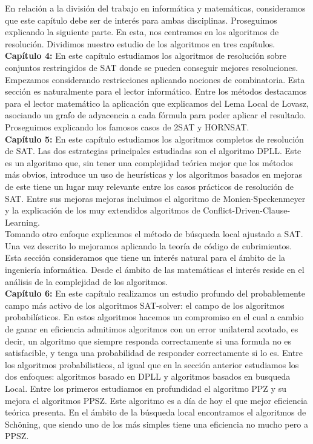 En relación a la división del trabajo en informática y matemáticas, consideramos que este capítulo debe ser de interés para ambas disciplinas. Proseguimos explicando la siguiente parte. En esta, nos centramos en los algoritmos de resolución. Dividimos nuestro estudio de los algoritmos en tres capítulos.\\


\textbf{Capítulo 4:} En este capítulo estudiamos los algoritmos de resolución sobre conjuntos restringidos de SAT donde se pueden conseguir mejores resoluciones. Empezamos considerando restricciones aplicando nociones de combinatoria. Esta sección es naturalmente para el lector informático. Entre los métodos destacamos para el lector matemático la aplicación que explicamos del Lema Local de Lovasz, asociando un grafo de adyacencia a cada fórmula para poder aplicar el resultado. Proseguimos explicando los famosos casos de 2SAT y HORNSAT. \\

\textbf{Capítulo 5:} En este capítulo estudiamos los algoritmos completos de resolución de SAT. Las dos estrategias principales estudiadas son el algoritmo DPLL. Este es un algoritmo que, sin tener una complejidad teórica mejor que los métodos más obvios, introduce un uso de heurísticas y los algoritmos basados en mejoras de este tiene un lugar muy relevante entre los casos prácticos de resolución de SAT. Entre sus mejoras mejoras incluimos el algoritmo de Monien-Speckenmeyer y la explicación de los muy extendidos algoritmos de Conflict-Driven-Clause-Learning.\\

Tomando otro enfoque explicamos el método de búsqueda local ajustado a SAT. Una vez descrito lo mejoramos aplicando la teoría de código de cubrimientos. Esta sección consideramos que tiene un interés natural para el ámbito de la ingeniería informática. Desde el ámbito de las matemáticas el interés reside en el análisis de la complejidad de los algoritmos.\\

\textbf{Capítulo 6:} En este capítulo realizamos un estudio profundo del probablemente campo más activo de los algoritmos SAT-solver: el campo de los algoritmos probabilísticos. En estos algoritmos hacemos un compromiso en el cual a cambio de ganar en eficiencia admitimos algoritmos con un error unilateral acotado, es decir, un algoritmo que siempre responda correctamente si una formula no es satisfacible, y tenga una probabilidad de responder correctamente si lo es. Entre los algoritmos probabilisticos, al igual que en la sección anterior estudiamos los dos enfoques: algoritmos basado en DPLL y algoritmos basados en busqueda Local. Entre los primeros estudiamos en profundidad el algoritmo PPZ y su mejora el algoritmos PPSZ. Este algoritmo es a día de hoy el que mejor eficiencia teórica presenta. En el ámbito de la búsqueda local encontramos el algoritmos de Schöning, que siendo uno de los más simples tiene una eficiencia no mucho pero a PPSZ. \\

